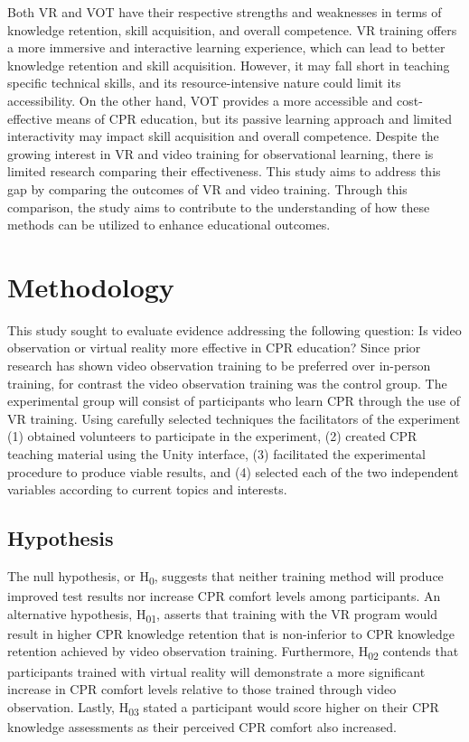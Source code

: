 \documentclass[manuscript]{./Models/acmart}
\begin{document}
Both VR and VOT have their respective strengths and weaknesses in terms of knowledge retention, skill acquisition, and overall competence. VR training offers a more immersive and interactive learning experience, which can lead to better knowledge retention and skill acquisition. However, it may fall short in teaching specific technical skills, and its resource-intensive nature could limit its accessibility. On the other hand, VOT provides a more accessible and cost-effective means of CPR education, but its passive learning approach and limited interactivity may impact skill acquisition and overall competence. Despite the growing interest in VR and video training for observational learning, there is limited research comparing their effectiveness. This study aims to address this gap by comparing the outcomes of VR and video training. Through this comparison, the study aims to contribute to the understanding of how these methods can be utilized to enhance educational outcomes.

\section{Methodology}
This study sought to evaluate evidence addressing the following question: Is video observation or virtual reality more effective in CPR education? Since prior research has shown video observation training to be preferred over in-person training, for contrast the video observation training was the control group. The experimental group will consist of participants who learn CPR through the use of VR training. Using carefully selected techniques the facilitators of the experiment (1) obtained volunteers to participate in the experiment, (2) created CPR teaching material using the Unity interface, (3) facilitated the experimental procedure to produce viable results, and (4) selected each of the two independent variables according to current topics and interests.

\subsection{Hypothesis}
The null hypothesis, or H\textsubscript{0}, suggests that neither training method will produce improved test results nor increase CPR comfort levels among participants. An alternative hypothesis, H\textsubscript{01}, asserts that training with the VR program would result in higher CPR knowledge retention that is non-inferior to CPR knowledge retention achieved by video observation training. Furthermore, H\textsubscript{02} contends that participants trained with virtual reality will demonstrate a more significant increase in CPR comfort levels relative to those trained through video observation. Lastly, H\textsubscript{03} stated a participant would score higher on their CPR knowledge assessments as their perceived CPR comfort also increased.
\end{document}
